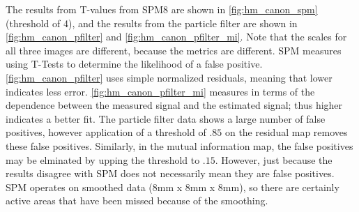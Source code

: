 The results from T-values from SPM8 are shown in \autoref{fig:hm_canon_spm} (threshold of
4), and the results from 
the particle filter are shown in \autoref{fig:hm_canon_pfilter} and \autoref{fig:hm_canon_pfilter_mi}.
Note that the scales for all three images are different, because the metrics are different.
SPM measures using T-Tests to determine the likelihood of a false positive. \autoref{fig:hm_canon_pfilter}
uses simple normalized residuals, meaning that lower indicates less error.  
\autoref{fig:hm_canon_pfilter_mi} measures in terms of the dependence between the 
measured signal and the estimated signal; thus higher indicates a better fit. The particle
filter data shows a large number of false positives, however application of a threshold
of $.85$ on the residual map removes these false positives. Similarly, in the mutual information
map, the false positives may be elminated by upping the threshold to $.15$. However, just
because the results disagree with SPM does not necessarily mean they are false positives.
SPM operates on smoothed data (8mm x 8mm x 8mm), so there are certainly active 
areas that have been missed because of the smoothing. 

